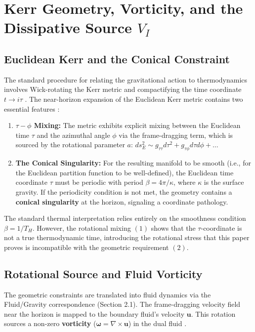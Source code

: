 \documentclass[11pt]{article}
\begin{document}
\section{Kerr Geometry, Vorticity, and the Dissipative Source $V_I$}

\subsection{Euclidean Kerr and the Conical Constraint}

The standard procedure for relating the gravitational action to thermodynamics involves Wick-rotating the Kerr metric\cite{Kerr1963} and compactifying the time coordinate $t \to i\tau$ \cite{GibbonsHawking1977}. The near-horizon expansion of the Euclidean Kerr metric\cite{Kerr1963} contains two essential features \cite{appendix_a1_kerr_expansion.tex}:

\begin{enumerate}
    \item \textbf{$\tau-\phi$ Mixing:} The metric exhibits explicit mixing between the Euclidean time $\tau$ and the azimuthal angle $\phi$ via the frame-dragging term, which is sourced by the rotational parameter $a$: $ds^2_E \sim g_{\tau\tau} d\tau^2 + g_{\tau\phi} d\tau d\phi + \dots$
    \item \textbf{The Conical Singularity:} For the resulting manifold to be smooth (i.e., for the Euclidean partition function to be well-defined), the Euclidean time coordinate $\tau$ must be periodic with period $\beta = 4\pi/\kappa$, where $\kappa$ is the surface gravity. If the periodicity condition is not met, the geometry contains a \textbf{conical singularity} at the horizon, signaling a coordinate pathology.
\end{enumerate}

The standard thermal interpretation relies entirely on the smoothness condition $\beta = 1/T_H$. However, the rotational mixing $(1)$ shows that the $\tau$-coordinate is not a true thermodynamic time, introducing the rotational stress that this paper proves is incompatible with the geometric requirement $(2)$.

\subsection{Rotational Source and Fluid Vorticity}

The geometric constraints are translated into fluid dynamics via the Fluid/Gravity correspondence (Section 2.1). The frame-dragging velocity field near the horizon is mapped to the boundary fluid's velocity $\mathbf{u}$. This rotation sources a non-zero \textbf{vorticity} ($\mathbf{\omega} = \nabla \times \mathbf{u}$) in the dual fluid \cite{appendix_a2_vorticity_calculation.tex}.
\end{document}
